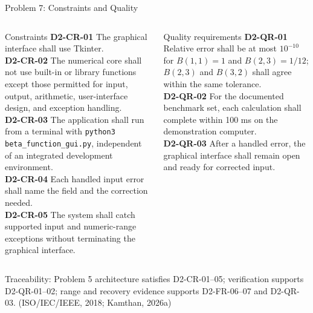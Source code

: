 \documentclass[aspectratio=169,10pt]{beamer}
\newcommand{\code}[1]{\texttt{#1}}
\newcommand{\smallcite}[1]{{\scriptsize (#1)}}
\begin{document}
\begin{frame}{Problem 7: Constraints and Quality}
  \begin{columns}[T]
    \begin{block}{Constraints}
      \scriptsize
      \textbf{D2-CR-01} The graphical interface shall use Tkinter.\\[0.25em]
      \textbf{D2-CR-02} The numerical core shall not use built-in or library
      functions except those permitted for input, output, arithmetic,
      user-interface design, and exception handling.\\[0.25em]
      \textbf{D2-CR-03} The application shall run from a terminal with
      \code{python3 beta\_function\_gui.py}, independent of an integrated
      development environment.\\[0.25em]
      \textbf{D2-CR-04} Each handled input error shall name the field and the
      correction needed.\\[0.25em]
      \textbf{D2-CR-05} The system shall catch supported input and numeric-range
      exceptions without terminating the graphical interface.
    \end{block}

    \begin{block}{Quality requirements}
      \scriptsize
      \textbf{D2-QR-01} Relative error shall be at most \(10^{-10}\) for
      \(B(1,1)=1\) and \(B(2,3)=1/12\); \(B(2,3)\) and \(B(3,2)\) shall agree
      within the same tolerance.\\[0.25em]
      \textbf{D2-QR-02} For the documented benchmark set, each calculation shall
      complete within 100 ms on the demonstration computer.\\[0.25em]
      \textbf{D2-QR-03} After a handled error, the graphical interface shall
      remain open and ready for corrected input.
    \end{block}
  \end{columns}

  \vspace{0.35em}
  \scriptsize
  Traceability: Problem 5 architecture satisfies D2-CR-01--05; verification
  supports D2-QR-01--02; range and recovery evidence supports D2-FR-06--07 and
  D2-QR-03.
  \smallcite{ISO/IEC/IEEE, 2018; Kamthan, 2026a}
\end{frame}
\end{document}
